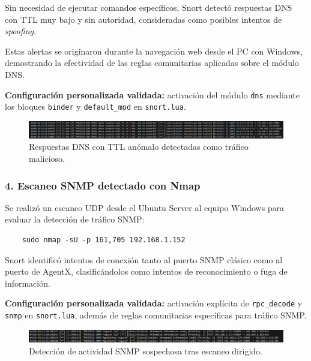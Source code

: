 \documentclass[12pt,a4paper]{report}
\begin{document}
Sin necesidad de ejecutar comandos específicos, Snort detectó respuestas DNS con TTL muy bajo y sin autoridad, consideradas como posibles intentos de \textit{spoofing}.

Estas alertas se originaron durante la navegación web desde el PC con Windows, demostrando la efectividad de las reglas comunitarias aplicadas sobre el módulo DNS.

\textbf{Configuración personalizada validada:} activación del módulo \texttt{dns} mediante los bloques \texttt{binder} y \texttt{default\_mod} en \texttt{snort.lua}.

\begin{figure}[H]
	\centering
	\includegraphics[width=\textwidth]{pruebas/2.png}
	\caption{Respuestas DNS con TTL anómalo detectadas como tráfico malicioso.}
\end{figure}

\vspace{0.5cm}

\subsubsection*{4. Escaneo SNMP detectado con Nmap}

Se realizó un escaneo UDP desde el Ubuntu Server al equipo Windows para evaluar la detección de tráfico SNMP:

\begin{verbatim}
	sudo nmap -sU -p 161,705 192.168.1.152
\end{verbatim}

Snort identificó intentos de conexión tanto al puerto SNMP clásico como al puerto de AgentX, clasificándolos como intentos de reconocimiento o fuga de información.

\textbf{Configuración personalizada validada:} activación explícita de \texttt{rpc\_decode} y \texttt{snmp} en \texttt{snort.lua}, además de reglas comunitarias específicas para tráfico SNMP.

\begin{figure}[H]
	\centering
	\includegraphics[width=\textwidth]{pruebas/5.png}
	\caption{Detección de actividad SNMP sospechosa tras escaneo dirigido.}
\end{figure}
\end{document}
